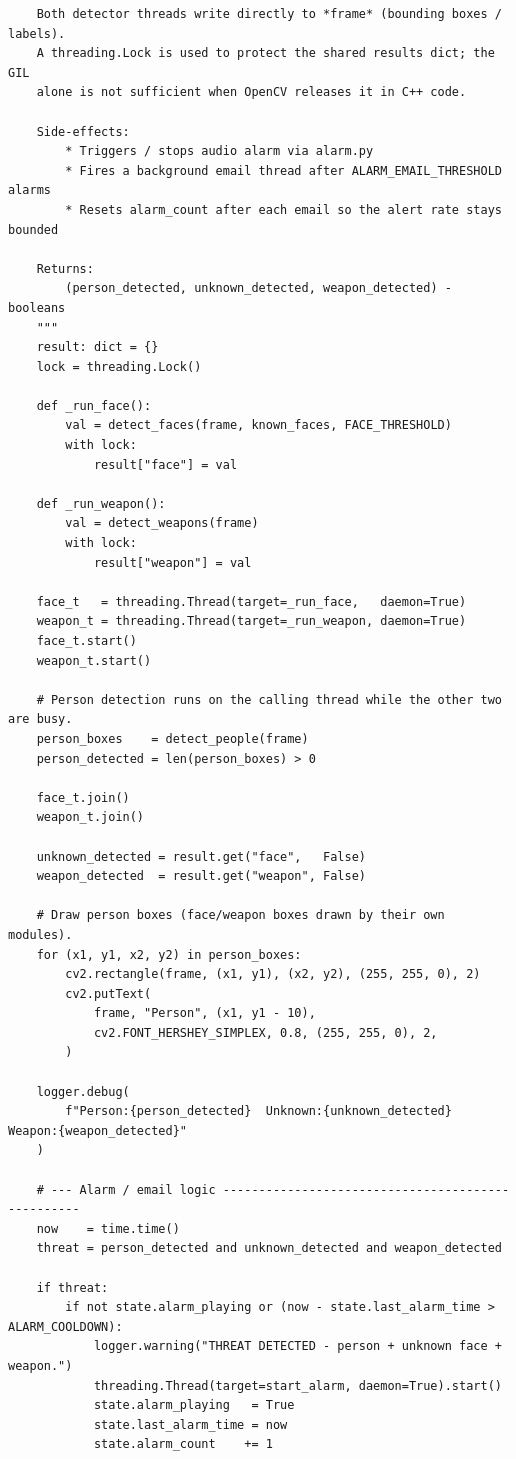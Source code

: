 \documentclass[12pt,a4paper]{report}
\begin{document}
\begin{lstlisting}
    Both detector threads write directly to *frame* (bounding boxes / labels).
    A threading.Lock is used to protect the shared results dict; the GIL
    alone is not sufficient when OpenCV releases it in C++ code.

    Side-effects:
        * Triggers / stops audio alarm via alarm.py
        * Fires a background email thread after ALARM_EMAIL_THRESHOLD alarms
        * Resets alarm_count after each email so the alert rate stays bounded

    Returns:
        (person_detected, unknown_detected, weapon_detected) - booleans
    """
    result: dict = {}
    lock = threading.Lock()

    def _run_face():
        val = detect_faces(frame, known_faces, FACE_THRESHOLD)
        with lock:
            result["face"] = val

    def _run_weapon():
        val = detect_weapons(frame)
        with lock:
            result["weapon"] = val

    face_t   = threading.Thread(target=_run_face,   daemon=True)
    weapon_t = threading.Thread(target=_run_weapon, daemon=True)
    face_t.start()
    weapon_t.start()

    # Person detection runs on the calling thread while the other two are busy.
    person_boxes    = detect_people(frame)
    person_detected = len(person_boxes) > 0

    face_t.join()
    weapon_t.join()

    unknown_detected = result.get("face",   False)
    weapon_detected  = result.get("weapon", False)

    # Draw person boxes (face/weapon boxes drawn by their own modules).
    for (x1, y1, x2, y2) in person_boxes:
        cv2.rectangle(frame, (x1, y1), (x2, y2), (255, 255, 0), 2)
        cv2.putText(
            frame, "Person", (x1, y1 - 10),
            cv2.FONT_HERSHEY_SIMPLEX, 0.8, (255, 255, 0), 2,
        )

    logger.debug(
        f"Person:{person_detected}  Unknown:{unknown_detected}  Weapon:{weapon_detected}"
    )

    # --- Alarm / email logic --------------------------------------------------
    now    = time.time()
    threat = person_detected and unknown_detected and weapon_detected

    if threat:
        if not state.alarm_playing or (now - state.last_alarm_time > ALARM_COOLDOWN):
            logger.warning("THREAT DETECTED - person + unknown face + weapon.")
            threading.Thread(target=start_alarm, daemon=True).start()
            state.alarm_playing   = True
            state.last_alarm_time = now
            state.alarm_count    += 1


\end{lstlisting}
\end{document}
